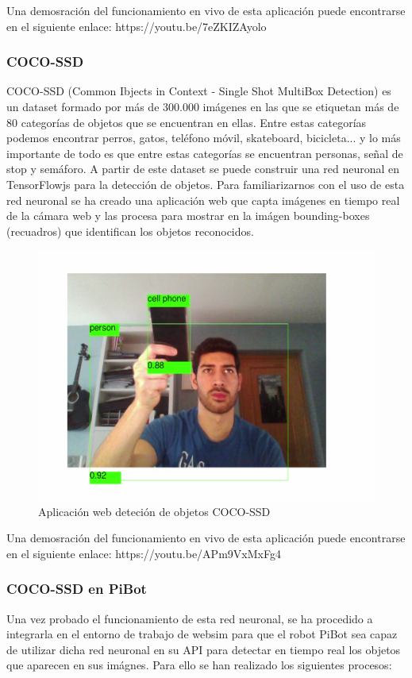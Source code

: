 \documentclass{report}
\begin{document}
Una demosración del funcionamiento en vivo de esta aplicación puede encontrarse en el siguiente enlace: https://youtu.be/7eZKIZAyolo

\subsubsection{COCO-SSD}
COCO-SSD (Common Ibjects in Context - Single Shot MultiBox Detection) es un dataset formado por más de 300.000 imágenes en las que se etiquetan más de 80 categorías de objetos que se encuentran en ellas. Entre estas categorías podemos encontrar perros, gatos, teléfono móvil, skateboard, bicicleta... y lo más importante de todo es que entre estas categorías se encuentran personas, señal de stop y semáforo. A partir de este dataset se puede construir una red neuronal en TensorFlowjs para la detección de objetos. Para familiarizarnos con el uso de esta red neuronal se ha creado una aplicación web que capta imágenes en tiempo real de la cámara web y las procesa para mostrar en la imágen bounding-boxes (recuadros) que identifican los objetos reconocidos.

\renewcommand{\figurename}{Figura}		
\begin{figure}[h]
	\centering
	 \includegraphics[scale=0.45]{images/cap4/coco.png}
	 \caption{Aplicación web deteción de objetos COCO-SSD}
\end{figure}

Una demosración del funcionamiento en vivo de esta aplicación puede encontrarse en el siguiente enlace: https://youtu.be/APm9VxMxFg4



\subsubsection{COCO-SSD en PiBot}
Una vez probado el funcionamiento de esta red neuronal, se ha procedido a integrarla en el entorno de trabajo de websim para que el robot PiBot sea capaz de utilizar dicha red neuronal en su API para detectar en tiempo real los objetos que aparecen en sus imágnes. Para ello se han realizado los siguientes procesos:
\\
\end{document}

